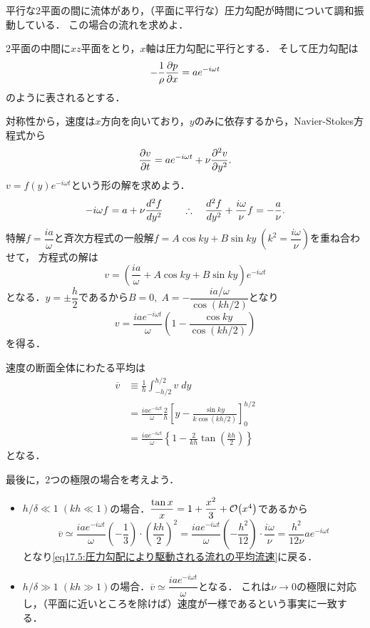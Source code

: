 
\begin{mondai}{}{}
平行な2平面の間に流体があり，（平面に平行な）圧力勾配が時間について調和振動している．
この場合の流れを求めよ．
\end{mondai}
\begin{kaitou}
2平面の中間に$xz$平面をとり，$x$軸は圧力勾配に平行とする．
そして圧力勾配は
\[
    -\frac{1}{\rho} \pdv{p}{x} = a e^{-i\omega t}
\]
のように表されるとする．

対称性から，速度は$x$方向を向いており，$y$のみに依存するから，Navier-Stokes方程式から
\[
    \pdv{v}{t} = a e^{-i\omega t} + \nu \pdv[2]{v}{y}.
\]
$v=f(y)e^{-i\omega t}$という形の解を求めよう．
\[
    -i\omega f = a + \nu \dv[2]{f}{y}
    \qquad \therefore\quad \dv[2]{f}{y} + \frac{i\omega}{\nu} f = -\frac{a}{\nu} .
\]
特解$f = \dfrac{ia}{\omega}$と斉次方程式の一般解$f = A\cos ky + B\sin ky \; \left( k^2 = \dfrac{i\omega}{\nu} \right)$を重ね合わせて，
方程式の解は
\[
    v = \left( \frac{ia}{\omega} + A\cos ky + B\sin ky \right) e^{-i\omega t}
\]
となる．$y=\pm\dfrac{h}{2}$であるから$B=0, \; A=-\dfrac{ia/\omega}{\cos(kh/2)}$となり
\[
    v = \frac{ia e^{-i\omega t}}{\omega} \left( 1 - \dfrac{\cos ky}{\cos(kh/2)} \right)
\]
を得る．

速度の断面全体にわたる平均は
\begin{align*}
    \overline{v} &\equiv \frac{1}{h} \int_{-h/2}^{h/2} v \; dy \\
    &= \frac{ia e^{-i\omega t}}{\omega} \frac{2}{h} \left[ y - \frac{\sin ky}{k \cos(kh/2)} \right]_0^{h/2} \\
    &= \frac{ia e^{-i\omega t}}{\omega} \left\{ 1 - \frac{2}{kh} \tan\left( \frac{kh}{2} \right) \right\}
\end{align*}
となる．


最後に，2つの極限の場合を考えよう．
\begin{itemize}
    \item $h/\delta \ll 1 \; (kh \ll 1)$の場合．$\dfrac{\tan x}{x} = 1 + \dfrac{x^2}{3} + \order{x^4}$であるから
    \[
        \overline{v} \simeq \frac{ia e^{-i\omega t}}{\omega} \left( - \frac{1}{3} \right) \cdot \left( \frac{kh}{2} \right)^2
        = \frac{ia e^{-i\omega t}}{\omega} \left( - \frac{h^2}{12} \right) \cdot \frac{i\omega}{\nu}
        = \frac{h^2}{12\nu} a e^{-i\omega t}
    \]
    となり\eqref{eq17.5:圧力勾配により駆動される流れの平均流速}に戻る．
    \item $h/\delta \gg 1 \; (kh \gg 1)$の場合．$\overline{v} \simeq \dfrac{ia e^{-i\omega t}}{\omega}$となる．
    これは$\nu\to0$の極限に対応し，（平面に近いところを除けば）速度が一様であるという事実に一致する．
\end{itemize}




\end{kaitou}




